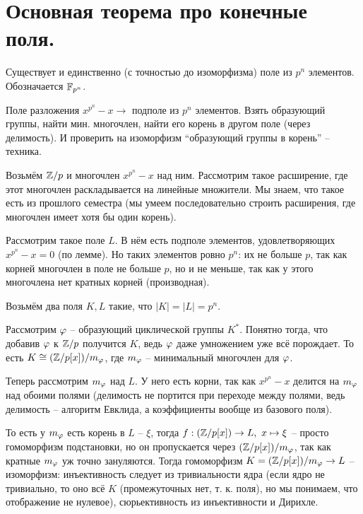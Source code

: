 \section{
 Основная теорема про конечные поля.
}

\thrm Существует и единственно (с точностью до изоморфизма) поле из $p^n$ элементов. Обозначается $\mathbb{F}_{p^n}$.

Поле разложения $x^{p^n} - x \to$ подполе из $p^n$ элементов. Взять образующий группы, найти мин. многочлен, найти его корень в другом поле (через делимость). И проверить на изоморфизм ``образующий группы в корень'' -- техника.


	
	Возьмём $\mathbb{Z}/p$ и многочлен $x^{p^n} - x$ над ним. Рассмотрим такое расширение, где этот многочлен раскладывается на линейные множители. Мы знаем, что такое есть из прошлого семестра (мы умеем последовательно строить расширения, где многочлен имеет хотя бы один корень).

	Рассмотрим такое поле $L$. В нём есть подполе элементов, удовлетворяющих $x^{p^n} - x = 0$ (по лемме). Но таких элементов ровно $p^n$: их не больше $p$, так как корней многочлен в поле не больше $p$, но и не меньше, так как у этого многочлена нет кратных корней (производная).



	Возьмём два поля $K, L$ такие, что $|K| = |L| = p^n$.

	Рассмотрим $\varphi$ -- образующий циклической группы $K^*$. Понятно тогда, что добавив $\varphi$ к $\mathbb{Z}/p$ получится $K$, ведь $\varphi$ даже умножением уже всё порождает. То есть $K \cong (\mathbb{Z}/p[x])/m_{\varphi}$, где $m_{\varphi}$ -- минимальный многочлен для $\varphi$.

	Теперь рассмотрим $m_{\varphi}$ над $L$. У него есть корни, так как $x^{p^n} - x$ делится на $m_{\varphi}$ над обоими полями (делимость не портится при переходе между полями, ведь делимость -- алгоритм Евклида, а коэффициенты вообще из базового поля). 

	То есть у $m_{\varphi}$ есть корень в $L$ -- $\xi$, тогда $f : (\mathbb{Z}/p[x]) \to L,\ x \mapsto \xi$ -- просто гомоморфизм подстановки, но он пропускается через $(\mathbb{Z}/p[x])/m_{\varphi}$, так как кратные $m_{\varphi}$ уж точно зануляются. Тогда гомоморфизм $K = (\mathbb{Z}/p[x])/m_{\varphi} \to L$ -- изоморфизм: инъективность следует из тривиальности ядра (если ядро не тривиально, то оно всё $K$ (промежуточных нет, т. к. поля), но мы понимаем, что отображение не нулевое), сюрьективность из инъективности и Дирихле.

\ethrm
